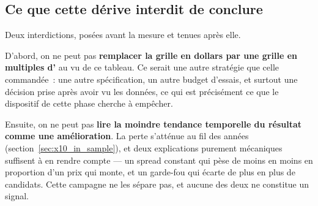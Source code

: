\subsection{Ce que cette dérive interdit de conclure}

Deux interdictions, posées avant la mesure et tenues après elle.

D'abord, on ne peut pas \textbf{remplacer la grille en dollars par une grille
en multiples d'} au vu de ce tableau. Ce serait une autre stratégie
que celle commandée~: une autre spécification, un autre budget d'essais, et
surtout une décision prise après avoir vu les données, ce qui est précisément
ce que le dispositif de cette phase cherche à empêcher.

Ensuite, on ne peut pas \textbf{lire la moindre tendance temporelle du
résultat comme une amélioration}. La perte s'atténue au fil des années
(section~\ref{sec:x10_in_sample}), et deux explications purement mécaniques
suffisent à en rendre compte --- un spread constant qui pèse de moins en moins
en proportion d'un prix qui monte, et un garde-fou qui écarte de plus en plus
de candidats. Cette campagne ne les sépare pas, et aucune des deux ne
constitue un signal.
